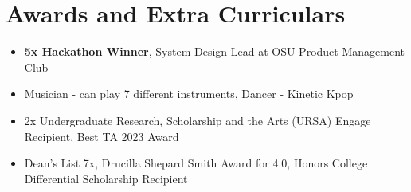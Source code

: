 \documentclass[letterpaper,11pt]{article}
\begin{document}

\section{Awards and Extra Curriculars}
\begin{itemize}[noitemsep]
  \item \textbf{5x Hackathon Winner}, System Design Lead at OSU Product Management Club
  \item Musician - can play 7 different instruments, Dancer - Kinetic Kpop
  \item 2x Undergraduate Research, Scholarship and the Arts (URSA) Engage Recipient, Best TA 2023 Award
  \item Dean's List 7x, Drucilla Shepard Smith Award for 4.0, Honors College Differential Scholarship Recipient
\end{itemize}
\end{document}
